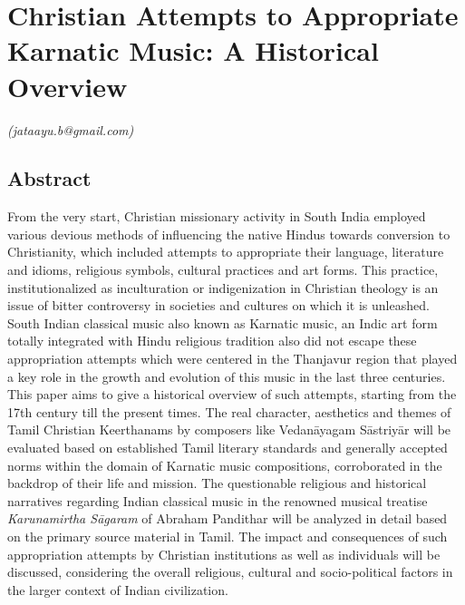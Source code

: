 
\chapter{Christian Attempts to Appropriate Karnatic Music: A Historical Overview}\label{chapter5}


\vspace{-.3cm}


\begin{flushright}
\textit{(jataayu.b@gmail.com)}
\end{flushright}


\section*{Abstract}

From the very start, Christian missionary activity in South India employed various devious methods of influencing the native Hindus towards conversion to Christianity, which included attempts to appropriate their language, literature and idioms, religious symbols, cultural practices and art forms. This practice, institutionalized as inculturation or indigenization in Christian theology is an issue of bitter controversy in societies and cultures on which it is unleashed. South Indian classical music also known as Karnatic music, an Indic art form totally integrated with Hindu religious tradition also did not escape these appropriation attempts which were centered in the Thanjavur region that played a key role in the growth and evolution of this music in the last three centuries. This paper aims to give a historical overview of such attempts, starting from the 17th century till the present times. The real character, aesthetics and themes of Tamil Christian Keerthanams by composers like Vedanāyagam Sāstriyār will be evaluated based on established Tamil literary standards and generally accepted norms within the domain of Karnatic music compositions, corroborated in the backdrop of their life and mission. The questionable religious and historical narratives regarding Indian classical music in the renowned musical treatise \textit{Karunamirtha Sāgaram} of Abraham Pandithar will be analyzed in detail based on the primary source material in Tamil. The impact and consequences of such appropriation attempts by Christian institutions as well as individuals will be discussed, considering the overall religious, cultural and socio-political factors in the larger context of Indian civilization.


